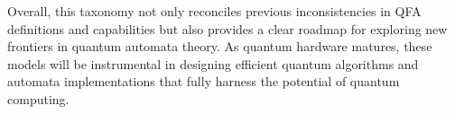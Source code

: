 Overall, this taxonomy not only reconciles previous inconsistencies in QFA definitions and capabilities but also provides a clear roadmap for exploring new frontiers in quantum automata theory. As quantum hardware matures, these models will be instrumental in designing efficient quantum algorithms and automata implementations that fully harness the potential of quantum computing.
